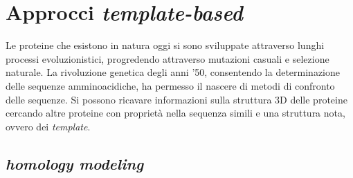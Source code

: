 \section{Approcci \textit{template-based}} \label{sec:template-based}
Le proteine che esistono in natura oggi si sono sviluppate attraverso lunghi processi evoluzionistici, progredendo attraverso mutazioni casuali e selezione naturale. La rivoluzione genetica degli anni '50, consentendo la determinazione delle sequenze amminoacidiche, ha permesso il nascere di metodi di confronto delle sequenze. Si possono ricavare informazioni sulla struttura 3D delle proteine cercando altre proteine con proprietà nella sequenza simili e una struttura nota, ovvero dei \textit{template}. 

\subsection{\textit{homology modeling}}
